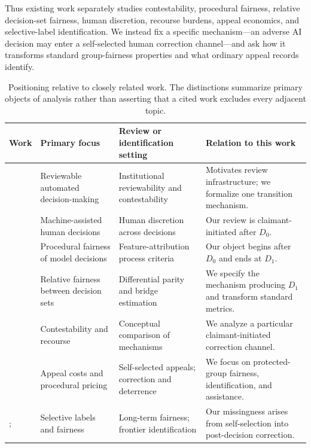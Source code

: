 \documentclass[manuscript,screen,review]{jair}
\begin{document}
Thus existing work separately studies contestability, procedural fairness,
relative decision-set fairness, human discretion, recourse burdens, appeal
economics, and selective-label identification.  We instead fix a specific
mechanism---an adverse AI decision may enter a self-selected human correction
channel---and ask how it transforms standard group-fairness properties and
what ordinary appeal records identify.

\begin{table}[t]
\centering
\caption{Positioning relative to closely related work.  The distinctions
summarize primary objects of analysis rather than asserting that a cited work
excludes every adjacent topic.}
\label{tab:related}
\footnotesize
\begin{tabularx}{\linewidth}{@{}p{.19\linewidth}p{.20\linewidth}p{.23\linewidth}Y@{}}
\toprule
Work & Primary focus & Review or identification setting & Relation to this work \\
\midrule
\citet{cobbe2021} & Reviewable automated decision-making & Institutional reviewability and contestability & Motivates review infrastructure; we formalize one transition mechanism. \\
\citet{gillis2022} & Machine-assisted human decisions & Human discretion across decisions & Our review is claimant-initiated after $D_0$. \\
\citet{wang2026procedural} & Procedural fairness of model decisions & Feature-attribution process criteria & Our object begins after $D_0$ and ends at $D_1$. \\
\citet{yu2026differential} & Relative fairness between decision sets & Differential parity and bridge estimation & We specify the mechanism producing $D_1$ and transform standard metrics. \\
\citet{freiesleben2026} & Contestability and recourse & Conceptual comparison of mechanisms & We analyze a particular claimant-initiated correction channel. \\
\citet{nitchals2026pricing} & Appeal costs and procedural pricing & Self-selected appeals; correction and deterrence & We focus on protected-group fairness, identification, and assistance. \\
\citet{valdrighi2026longterm}; \citet{liu2026frontiers} & Selective labels and fairness & Long-term fairness; frontier identification & Our missingness arises from self-selection into post-decision correction. \\
\bottomrule
\end{tabularx}
\end{table}
\end{document}
